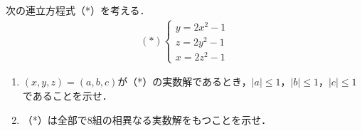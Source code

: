 次の連立方程式（*）を考える．
\begin{align*}
  (*)
  \begin{cases}
    y=2x^2-1 \\
    z=2y^2-1 \\
    x=2z^2-1
  \end{cases}
\end{align*}
\begin{enumerate}
  \item $(x,y,z)=(a,b,c)$が（*）の実数解であるとき，$|a|\le 1$，$|b|\le 1$，$|c|\le 1$であることを示せ．
  \item （*）は全部で$8$組の相異なる実数解をもつことを示せ．
\end{enumerate}